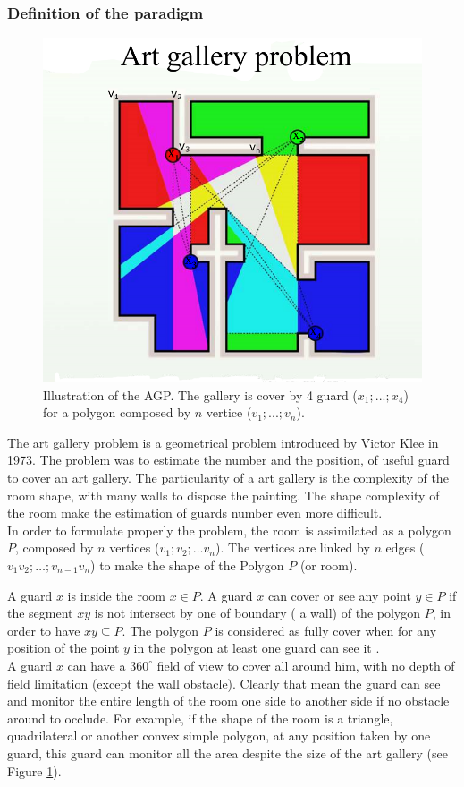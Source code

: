 	\subsubsection{Definition of the paradigm} \label{sec:AGPdef}
	\begin{figure}[t!]
\center
{}
   \includegraphics[width=\linewidth]{img/AGP3.png}
  \caption{ Illustration of the AGP. The gallery is cover by  4 guard ($x_1;...;x_4$) for a polygon  composed by $n$ vertice ($v_1;...;v_n$).}\label{fig:AGP}
  \endminipage\hfill
\end{figure}
	The art gallery problem is a geometrical problem introduced by Victor Klee in 1973. The problem was to estimate the number and the position, of useful guard to cover an art gallery. 
The particularity of a art gallery is the complexity of the room shape, with many walls to dispose the painting. The shape complexity of the room make the estimation of guards number even more difficult.\\
In order to formulate properly the problem, the room is assimilated as a polygon $P$, composed by $n$ vertices ($v_1; v_2;…v_n$). The vertices are linked by $n$ edges ($v_1 v_2;…; v_{n-1} v_n$) to make the shape of the Polygon $P$ (or room).

A guard $x$ is inside the room $x \in P$. A guard $x$ can cover or see any point $y \in P$ if the segment $xy$ is not intersect by one of boundary ( a wall) of the polygon $P$, in order to have $ xy \subseteq P$.
The polygon $P$ is considered as fully cover when for any position of the point $y$ in the polygon at least one guard can see it .\\
A guard $x$ can have a $360^\circ$ field of view to cover all around him, with no depth of field limitation (except the wall obstacle). Clearly that mean the guard can see and monitor the entire length of the room one side to another side if no obstacle around to occlude. For example, if the shape of the room is a triangle, quadrilateral or another convex simple polygon, at any position taken by one guard, this guard can monitor all the area despite the size of the art gallery (see Figure \ref{fig:AGP}). 

